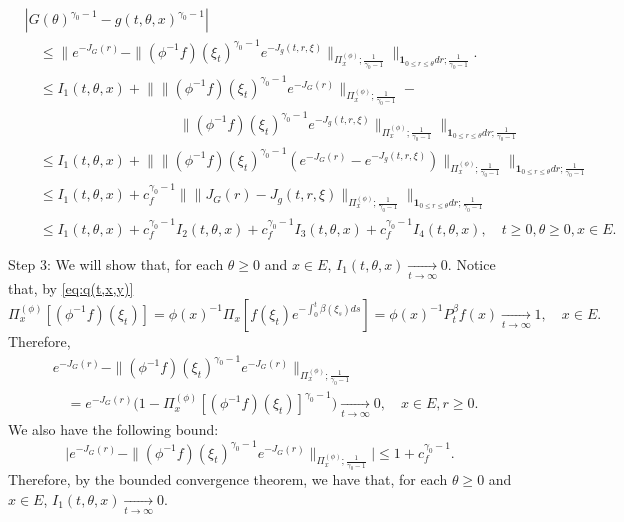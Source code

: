\documentclass[12pt, a4paper]{amsart}
\theoremstyle{definition}
\numberwithin{equation}{section}
\begin{document}
\[\begin{split}
	&|  G(\theta)^{\gamma_0 - 1} - g(t,\theta,x)^{\gamma_0 - 1} |
	\\&\quad \leq \Big\| e^{ - J_G(r)} - \| (\phi^{-1}f)(\xi_t)^{\gamma_0 - 1} e^{-J_g(t, r,\xi)} \|_{\Pi_x^{(\phi)};\frac{1}{\gamma_0 - 1}} \Big\|_{\mathbf 1_{0\leq r\leq \theta} dr;\frac{1}{\gamma_0 - 1}}.
	\\&\quad \leq I_1(t,\theta,x) + \Big\| \| (\phi^{-1}f)(\xi_t)^{\gamma_0 - 1} e^{-J_G(r)} \|_{\Pi_x^{(\phi)};\frac{1}{\gamma_0 - 1}} - 
	\\&\quad \qquad \qquad \qquad \qquad \qquad \| (\phi^{-1}f)(\xi_t)^{\gamma_0 - 1} e^{-J_g(t,r,\xi)} \|_{\Pi_x^{(\phi)};\frac{1}{\gamma_0 - 1}} \Big\|_{\mathbf 1_{0\leq r\leq \theta} dr;\frac{1}{\gamma_0 - 1}}
	\\&\quad \leq I_1(t,\theta,x) + \Big\| \|  (\phi^{-1}f)(\xi_t)^{\gamma_0 - 1} ( e^{-J_G(r)} - e^{-J_g(t,r,\xi)} )  \|_{\Pi_x^{(\phi)};\frac{1}{\gamma_0 - 1}} \Big\|_{\mathbf 1_{0\leq r\leq \theta} dr;\frac{1}{\gamma_0 - 1}}
	\\&\quad \leq I_1(t,\theta,x) + c_f^{\gamma_0 - 1}\Big\| \|  J_G(r) -J_g(t,r,\xi)  \|_{\Pi_x^{(\phi)};\frac{1}{\gamma_0 - 1}} \Big\|_{\mathbf 1_{0\leq r\leq \theta} dr;\frac{1}{\gamma_0 - 1}}
	\\&\quad \leq I_1(t,\theta,x) + c_f^{\gamma_0 - 1} I_2(t,\theta,x) +c_f^{\gamma_0 - 1} I_3(t,\theta,x)+c_f^{\gamma_0 - 1} I_4(t,\theta,x),
	\quad t\geq 0, \theta \geq 0, x\in E.
\end{split}\]
	
	Step 3: We will show that, for each $\theta \geq 0$ and $x\in E$, $I_1(t,\theta,x) \xrightarrow[t\to \infty]{} 0$.
	Notice that, 
	by \eqref{eq:q(t,x,y)}
\[
	\Pi_x^{(\phi)} [(\phi^{-1}f)(\xi_t)]
	= \phi(x)^{-1}\Pi_x[f(\xi_t) e^{- \int_0^t \beta(\xi_s) ds}]
	= \phi(x)^{-1} P^\beta_t f(x)
	\xrightarrow[t\to \infty]{} 1,
	\quad x\in E.
\]
	Therefore,
\[\begin{split}
	&e^{ - J_G(r)} - \| (\phi^{-1}f)(\xi_t)^{\gamma_0 - 1} e^{-J_G(r)} \|_{\Pi_x^{(\phi)};\frac{1}{\gamma_0 - 1}}
	\\&\quad =e^{ - J_G(r)} \Big( 1   -  \Pi_x^{(\phi)}[ (\phi^{-1}f)(\xi_t) ]^{\gamma_0 - 1}   \Big)
	\xrightarrow[t\to \infty]{} 0,
	\quad x\in E, r\geq 0.
\end{split}\]
	We also have the following bound:
\[
	\Big| e^{ - J_G(r)} - \| (\phi^{-1}f)(\xi_t)^{\gamma_0 - 1} e^{-J_G(r)} \|_{\Pi_x^{(\phi)};\frac{1}{\gamma_0 - 1}} \Big|
	\leq 1+ c_f^{\gamma_0 - 1}.
\]
	Therefore, by the bounded convergence theorem, we have that, for each $\theta \geq 0$ and $x\in E$, $I_1(t,\theta, x) \xrightarrow[t\to \infty]{} 0$.
	
\end{document}
